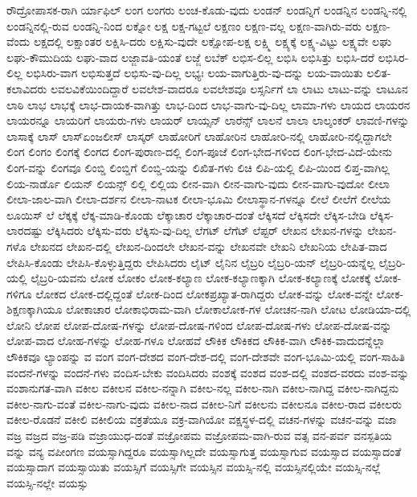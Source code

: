 {ರೌದ್ರೋಪಾಸಕ-ರಾಗಿ
ರ್ಯಾಫಿಲ್
ಲಂಗ
ಲಂಗರು
ಲಂಚ-ಕೊಡು-ವುದು
ಲಂಡನ್
ಲಂಡನ್ನಿಗೆ
ಲಂಡನ್ನಿನ
ಲಂಡನ್ನಿ-ನಲ್ಲಿ
ಲಂಡನ್ನಿನಲ್ಲಿ-ರುವ
ಲಂಡನ್ನಿ-ನಿಂದ
ಲಕ್ನೋ
ಲಕ್ಷ
ಲಕ್ಷ-ಗಟ್ಟಲೆ
ಲಕ್ಷಣಂ
ಲಕ್ಷಣ-ವಲ್ಲ
ಲಕ್ಷಣ-ವಾಗಿರು-ವರು
ಲಕ್ಷಣ-ವೆಂದು
ಲಕ್ಷದಲ್ಲಿ
ಲಕ್ಷಾಂತರ
ಲಕ್ಷಿಸಿ-ದರು
ಲಕ್ಷಿಸು-ವುದೇ
ಲಕ್ಷೋಪ-ಲಕ್ಷ
ಲಕ್ಷ್ಮಿ
ಲಕ್ಷ್ಯಕ್ಕೆ
ಲಕ್ಷ್ಯ-ವಿಟ್ಟು
ಲಕ್ಷ್ಯವೇ
ಲಘು
ಲಘು-ಕೌಮುದಿಯ
ಲಘು-ವಾದ
ಲಜ್ಜಾವತಿ-ಯಂತೆ
ಲಜ್ಜೆ
ಲಬೆಕ್
ಲಭಿಸ-ಲಿಲ್ಲ
ಲಭಿಸಿ
ಲಭಿಸಿತ್ತು
ಲಭಿಸಿ-ದರೆ
ಲಭಿಸಿರ-ಲಿಲ್ಲ
ಲಭಿಸಿರು-ವಾಗ
ಲಭಿಸುತ್ತದೆ
ಲಭಿಸು-ವು-ದಿಲ್ಲ
ಲಭ್ಯಃ
ಲಯ-ವಾಗುತ್ತಿರು-ವು-ದನ್ನು
ಲಯ-ವಾಯಿತು
ಲಲಿತ-ಕಲಾವಿದರು
ಲವಲವಿಕೆಯಿಂದಿದ್ದಾರೆ
ಲವಲೇಶ-ವಾದರೂ
ಲವಲೇಶವೂ
ಲಸ್ಸರ್ನಿಗೆ
ಲಾ
ಲಾಟು
ಲಾಟು-ವನ್ನು
ಲಾಟೂನ
ಲಾಠಿ
ಲಾಭ
ಲಾಭಕ್ಕೆ
ಲಾಭ-ದಾಯಕ-ವಾಗಿತ್ತು
ಲಾಭ-ದಿಂದ
ಲಾಭ-ವಾಗು-ವು-ದಿಲ್ಲ
ಲಾಮಾ-ಗಳು
ಲಾಯದ
ಲಾಯರನ
ಲಾಯರನ್ನೂ
ಲಾಯರಿಗೆ
ಲಾಯರು-ಗಳು
ಲಾಯರ್
ಲಾಯ್ಸನ್
ಲಾರೆನ್ಸ್
ಲಾಲನೆ
ಲಾಲಾ
ಲಾಲ್ಶಂಕರ್
ಲಾವಣಿ-ಗಳನ್ನು
ಲಾಸಾಕ್ಕೆ
ಲಾಸ್
ಲಾಸ್ಏಂಜಲೀಸ್
ಲಾಸ್ಕರ್
ಲಾಹೋರಿಗೆ
ಲಾಹೋರಿನ
ಲಾಹೋರಿ-ನಲ್ಲಿ
ಲಾಹೋರಿ-ನಲ್ಲಿದ್ದಾಗಲೇ
ಲಿಂಗ
ಲಿಂಗಂ
ಲಿಂಗಕ್ಕೆ
ಲಿಂಗದ
ಲಿಂಗ-ಪುರಾಣ-ದಲ್ಲಿ
ಲಿಂಗ-ಪೂಜೆ
ಲಿಂಗ-ಭೇದ-ಗಳಿಂದ
ಲಿಂಗ-ಭೇದ-ವಿದೆ-ಯೇನು
ಲಿಂಗ-ವನ್ನು
ಲಿಂಗವೂ
ಲಿಂಬ್ಡಿ
ಲಿಂಬ್ಡಿಗೆ
ಲಿಂಬ್ಡಿ-ಯನ್ನು
ಲಿಖಿತ-ಗಳು
ಲಿಚಿ
ಲಿಪಿ-ಯಲ್ಲಿ
ಲಿಪಿ-ಯಿಂದ
ಲಿಪ್ತ-ವಾಗಿಲ್ಲ
ಲಿಯ-ನಾರ್ಡೊ
ಲಿಯನ್
ಲಿಯನ್ಸ್
ಲಿಲ್ಲಿ
ಲಿಲ್ಲಿಯ
ಲೀನ-ವಾಗಿ
ಲೀನ-ವಾಗು-ವುದು
ಲೀನ-ವಾಗು-ವುದೋ
ಲೀಲಾ
ಲೀಲಾ-ಜಾಲ-ವಾಗಿ
ಲೀಲಾ-ದರ್ಶನ
ಲೀಲಾ-ನಾಟಕ
ಲೀಲಾ-ಭೂಮಿ
ಲೀಲಾಸ್ಥಾನ-ಗಳನ್ನೂ
ಲೀಲೆ
ಲೀಲೆಗೆ
ಲೀಲೆಯ
ಲೂಯಿಸ್
ಲೆ
ಲೆಕ್ಕಕ್ಕೆ
ಲೆಕ್ಕ-ಮಾಡಿ-ಕೊಂಡು
ಲೆಕ್ಕಾಚಾರ
ಲೆಕ್ಕಾಚಾರ-ದಂತೆ
ಲೆಕ್ಕಿಸದೆ
ಲೆಕ್ಕಿಸದೇ
ಲೆಕ್ಕಿಸ-ಬೇಡಿ
ಲೆಕ್ಕಿಸ-ಲಾರದಷ್ಟು
ಲೆಕ್ಕಿಸಿದರು
ಲೆಕ್ಕಿಸು-ವರು
ಲೆಕ್ಕಿಸು-ವು-ದಿಲ್ಲ
ಲೆಗಟ್
ಲೆಗೆಟ್
ಲೆಪ್ಟರ್
ಲೇಖನ
ಲೇಖನ-ಗಳನ್ನು
ಲೇಖನ-ಗಳೊ
ಲೇಖನದ
ಲೇಖನ-ದಲ್ಲಿ
ಲೇಖನ-ದಿಂದಲೇ
ಲೇಖನ-ವನ್ನು
ಲೇಖನವೇ
ಲೇಖನಿ
ಲೇಖನಿಯ
ಲೇಪಿತ-ವಾದ
ಲೇಪಿಸಿ-ಕೊಂಡು
ಲೇಪಿಸಿ-ಕೊಳ್ಳುತ್ತಿದ್ದರು
ಲೇಪಿಸಿದರು
ಲೈಟ್
ಲೈನಿನ
ಲೈಬ್ರರಿ
ಲೈಬ್ರರಿ-ಯನ್
ಲೈಬ್ರರಿ-ಯನ್ನೆಲ್ಲ
ಲೈಬ್ರರಿ-ಯಲ್ಲಿ
ಲೈಬ್ರರಿ-ಯವನು
ಲೋಕ
ಲೋಕಂ
ಲೋಕ-ಕಲ್ಯಾಣ
ಲೋಕ-ಕಲ್ಯಾಣಕ್ಕಾಗಿ
ಲೋಕ-ಕಲ್ಯಾಣಕ್ಕೆ
ಲೋಕಕ್ಕೆ
ಲೋಕ-ಗಳಿಗೂ
ಲೋಕದ
ಲೋಕ-ದಲ್ಲಿದ್ದಂತೆ
ಲೋಕ-ದಿಂದ
ಲೋಕಪ್ರಖ್ಯಾತ-ರಾಗಿದ್ದರು
ಲೋಕ-ವನ್ನು
ಲೋಕ-ವನ್ನೇ
ಲೋಕ-ಶಿಕ್ಷಣಕ್ಕಾಗಿಯೂ
ಲೋಕಾಚಾರ
ಲೋಕಾಭಿರಾಮ-ವಾಗಿ
ಲೋಕಾಲೋಕ-ಗಳ
ಲೋಚನ-ನಾಗಿ
ಲೋಟ
ಲೋಡಿಯಾ-ದಲ್ಲಿ
ಲೋನಿ
ಲೋಪ
ಲೋಪ-ದೋಷ-ಗಳನ್ನು
ಲೋಪ-ದೋಷ-ಗಳಿಂದ
ಲೋಪ-ದೋಷ-ಗಳು
ಲೋಪ-ದೋಷ-ವನ್ನು
ಲೋಪ-ವಾದ
ಲೋಹ-ಗಳನ್ನು
ಲೋಹ-ಗಳೂ
ಲೋಹವೆ
ಲೌಕಿಕ
ಲೌಕಿಕದ
ಲೌಕಿಕ-ವಾಗಿ
ಲೌಕಿಕ-ವಾದುದನ್ನೆಲ್ಲಾ
ಲೌಕಿಕವೂ
ಲ್ಯಾಂಪನ್ನು
ವ
ವಂಗ
ವಂಗ-ದೇಶದ
ವಂಗ-ದೇಶ-ದಲ್ಲಿ
ವಂಗ-ದೇಶವೇ
ವಂಗ-ಭೂಮಿ-ಯಲ್ಲಿ
ವಂಗ-ಸಾಹಿತಿ
ವಂದನೆ-ಗಳನ್ನು
ವಂದನೆ-ಗಳು
ವಂದಿಸ-ಬೇಕು
ವಂದಿಸಿದರು
ವಂಶಕ್ಕೆ
ವಂಶದ
ವಂಶ-ದಲ್ಲಿ
ವಂಶದ-ವರದು
ವಂಶ-ವನ್ನು
ವಂಶಾನುಗತ-ವಾಗಿ
ವಕೀಲ
ವಕೀಲನ
ವಕೀಲ-ನನ್ನಾಗಿ
ವಕೀಲ-ನಲ್ಲ
ವಕೀಲ-ನಾಗಿ
ವಕೀಲ-ನಾಗಿದ್ದ
ವಕೀಲ-ನಾಗಿದ್ದನು
ವಕೀಲ-ನಾಗು-ವಂತೆ
ವಕೀಲ-ನಾಗು-ವುದು
ವಕೀಲ-ನಾದ
ವಕೀಲ-ನಿಗೆ
ವಕೀಲನು
ವಕೀಲನೂ
ವಕೀಲ-ರಾದ
ವಕೀಲರು
ವಕೀಲ-ರೊಡನೆ
ವಕೀಲಿ
ವಕೀಲಿಯ
ವಕ್ರತೆಯೂ
ವಕ್ರ-ವಾಗಿಯೋ
ವಕ್ಷಸ್ಥಳ-ದಲ್ಲಿ
ವಚನ-ಗಳನ್ನು
ವಚನ-ವನ್ನು
ವಜಾ
ವಜ್ರ
ವಜ್ರದ
ವಜ್ರ-ಪಡಿ
ವಜ್ರಾಯುಧ-ದಂತೆ
ವಜ್ರೋಪಮ
ವಜ್ರೋಪಮ-ವಾಗಿ-ರುವ
ವತ್ಸ
ವನ-ಪರ್ವ
ವನಸ್ಪತಿಯ
ವನ್ನು
ವನ್ಯ
ವಪೀಂಗಣ
ವಯಸ್ಸಾಗಿದ್ದರೂ
ವಯಸ್ಸಾಗಿಲ್ಲದೇ
ವಯಸ್ಸಾಗುತ್ತ
ವಯಸ್ಸಾಗುವ
ವಯಸ್ಸಾದ
ವಯಸ್ಸಾದಂತೆ
ವಯಸ್ಸಾದಾಗ
ವಯಸ್ಸಾಯಿತು
ವಯಸ್ಸಿಗೆ
ವಯಸ್ಸಿಗೇ
ವಯಸ್ಸಿನ
ವಯಸ್ಸಿ-ನಲ್ಲಿ
ವಯಸ್ಸಿನಲ್ಲಿಯೇ
ವಯಸ್ಸಿ-ನಲ್ಲೆ
ವಯಸ್ಸಿ-ನಲ್ಲೇ
ವಯಸ್ಸು
}
